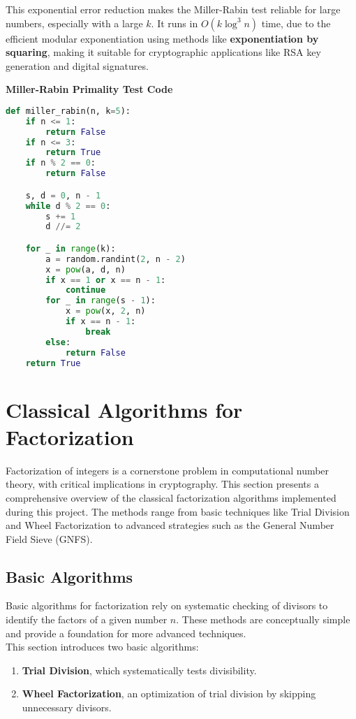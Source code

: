 \documentclass[12pt]{report}
\begin{document}
    This exponential error reduction makes the Miller-Rabin test reliable for large numbers, especially with a large $k$. It runs in $O(k \log^3 n)$ time, due to the efficient modular exponentiation using methods like \textbf{exponentiation by squaring}, making it suitable for cryptographic applications like RSA key generation and digital signatures.

\begin{center}
    \textbf{Miller-Rabin Primality Test Code}
\end{center}

\begin{lstlisting}[language=Python]
def miller_rabin(n, k=5):
    if n <= 1:
        return False
    if n <= 3:
        return True
    if n % 2 == 0:
        return False

    s, d = 0, n - 1
    while d % 2 == 0:
        s += 1
        d //= 2

    for _ in range(k):
        a = random.randint(2, n - 2)
        x = pow(a, d, n)
        if x == 1 or x == n - 1:
            continue
        for _ in range(s - 1):
            x = pow(x, 2, n)
            if x == n - 1:
                break
        else:
            return False
    return True
\end{lstlisting}


\clearpage
\section{Classical Algorithms for Factorization}

Factorization of integers is a cornerstone problem in computational number theory, with critical implications in cryptography. This section presents a comprehensive overview of the classical factorization algorithms implemented during this project. The methods range from basic techniques like Trial Division and Wheel Factorization to advanced strategies such as the General Number Field Sieve (GNFS).  

\subsection{Basic Algorithms}
Basic algorithms for factorization rely on systematic checking of divisors to identify the factors of a given number $n$. These methods are conceptually simple and provide a foundation for more advanced techniques.  \\
This section introduces two basic algorithms:
\begin{enumerate}
    \item \textbf{Trial Division}, which systematically tests divisibility.
    \item \textbf{Wheel Factorization}, an optimization of trial division by skipping unnecessary divisors.
\end{enumerate}  
\end{document}
